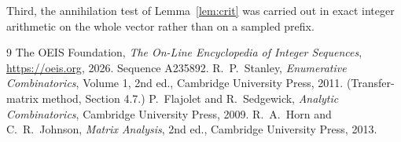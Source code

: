\documentclass[11pt,a4paper]{article}
\theoremstyle{plain}
\theoremstyle{definition}
\begin{document}
Third, the annihilation test of Lemma~\ref{lem:crit} was carried out in exact integer
arithmetic on the whole vector rather than on a sampled prefix.

\begin{thebibliography}{9}
 The OEIS Foundation, \emph{The On-Line Encyclopedia of Integer
Sequences}, \url{https://oeis.org}, 2026. Sequence A235892.
 R.~P.~Stanley, \emph{Enumerative Combinatorics}, Volume 1, 2nd ed.,
Cambridge University Press, 2011. (Transfer-matrix method, Section 4.7.)
 P.~Flajolet and R.~Sedgewick, \emph{Analytic Combinatorics}, Cambridge
University Press, 2009.
 R.~A.~Horn and C.~R.~Johnson, \emph{Matrix Analysis}, 2nd ed., Cambridge
University Press, 2013.
\end{thebibliography}
\end{document}
